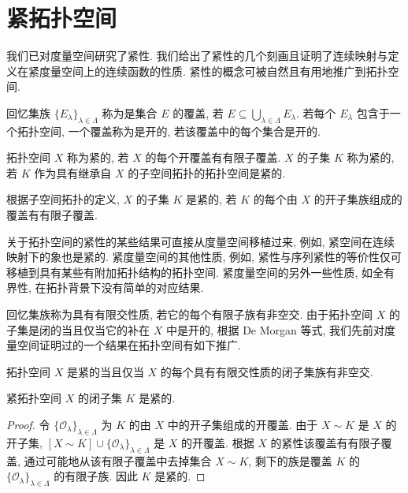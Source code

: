 \documentclass[../../main.tex]{subfiles}
\begin{document}
\section{紧拓扑空间}\label{section:ch11-紧拓扑空间}

我们已对度量空间研究了紧性. 我们给出了紧性的几个刻画且证明了连续映射与定义在紧度量空间上的连续函数的性质. 紧性的概念可被自然且有用地推广到拓扑空间.

回忆集族 $\{E_{\lambda}\}_{\lambda\in\Lambda}$ 称为是集合 $E$ 的覆盖, 若 $E\subseteq\bigcup_{\lambda\in\Lambda}E_{\lambda}$. 若每个 $E_{\lambda}$ 包含于一个拓扑空间, 一个覆盖称为是开的, 若该覆盖中的每个集合是开的.

\begin{definition}[紧空间]\label{definition:ch11-紧空间}
拓扑空间 $X$ 称为紧的, 若 $X$ 的每个开覆盖有有限子覆盖. $X$ 的子集 $K$ 称为紧的, 若 $K$ 作为具有继承自 $X$ 的子空间拓扑的拓扑空间是紧的.
\end{definition}

根据子空间拓扑的定义, $X$ 的子集 $K$ 是紧的, 若 $K$ 的每个由 $X$ 的开子集族组成的覆盖有有限子覆盖.

关于拓扑空间的紧性的某些结果可直接从度量空间移植过来, 例如, 紧空间在连续映射下的象也是紧的. 紧度量空间的其他性质, 例如, 紧性与序列紧性的等价性仅可移植到具有某些有附加拓扑结构的拓扑空间. 紧度量空间的另外一些性质, 如全有界性, 在拓扑背景下没有简单的对应结果.

回忆集族称为具有有限交性质, 若它的每个有限子族有非空交. 由于拓扑空间 $X$ 的子集是闭的当且仅当它的补在 $X$ 中是开的, 根据 De Morgan 等式, 我们先前对度量空间证明过的一个结果在拓扑空间有如下推广.

\begin{proposition}\label{proposition:ch11-有限交}
拓扑空间 $X$ 是紧的当且仅当 $X$ 的每个具有有限交性质的闭子集族有非空交.
\end{proposition}

\begin{proposition}\label{proposition:ch11-紧子集闭}
紧拓扑空间 $X$ 的闭子集 $K$ 是紧的.
\end{proposition}

\begin{proof}
令 $\{\mathcal{O}_{\lambda}\}_{\lambda\in\Lambda}$ 为 $K$ 的由 $X$ 中的开子集组成的开覆盖. 由于 $X\sim K$ 是 $X$ 的开子集, $[X\sim K]\cup\{\mathcal{O}_{\lambda}\}_{\lambda\in\Lambda}$ 是 $X$ 的开覆盖. 根据 $X$ 的紧性该覆盖有有限子覆盖, 通过可能地从该有限子覆盖中去掉集合 $X\sim K$, 剩下的族是覆盖 $K$ 的 $\{\mathcal{O}_{\lambda}\}_{\lambda\in\Lambda}$ 的有限子族. 因此 $K$ 是紧的.
\end{proof}
\end{document}
